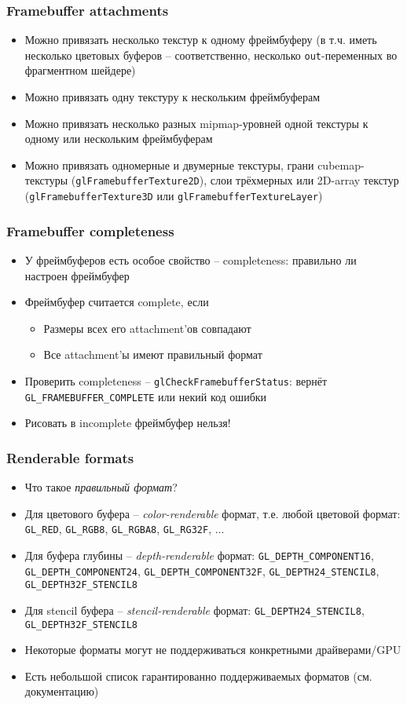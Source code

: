 \documentclass{beamer}
\begin{document}
\begin{frame}[fragile]
\frametitle{Framebuffer attachments}
\begin{itemize}
\item Можно привязать несколько текстур к одному фреймбуферу (в т.ч. иметь несколько цветовых буферов -- соответственно, несколько \verb|out|-переменных во фрагментном шейдере)
\pause
\item Можно привязать одну текстуру к нескольким фреймбуферам
\pause
\item Можно привязать несколько разных mipmap-уровней одной текстуры к одному или нескольким фреймбуферам
\pause
\item Можно привязать одномерные и двумерные текстуры, грани cubemap-текстуры (\verb|glFramebufferTexture2D|), слои трёхмерных или 2D-array текстур (\verb|glFramebufferTexture3D| или \verb|glFramebufferTextureLayer|)
\end{itemize}
\end{frame}

\begin{frame}[fragile]
\frametitle{Framebuffer completeness}
\begin{itemize}
\item У фреймбуферов есть особое свойство -- completeness: правильно ли настроен фреймбуфер
\pause
\item Фреймбуфер считается complete, если
\begin{itemize}
\item Размеры всех его attachment'ов совпадают
\pause
\item Все attachment'ы имеют правильный формат
\end{itemize}
\pause
\item Проверить completeness -- \verb|glCheckFramebufferStatus|: вернёт \verb|GL_FRAMEBUFFER_COMPLETE| или некий код ошибки
\pause
\item Рисовать в incomplete фреймбуфер нельзя!
\end{itemize}
\end{frame}

\begin{frame}[fragile]
\frametitle{Renderable formats}
\begin{itemize}
\item Что такое \textit{правильный формат}?
\pause
\item Для цветового буфера -- \textit{color-renderable} формат, т.е. любой цветовой формат: \verb|GL_RED|, \verb|GL_RGB8|, \verb|GL_RGBA8|, \verb|GL_RG32F|, ...
\pause
\item Для буфера глубины -- \textit{depth-renderable} формат: \verb|GL_DEPTH_COMPONENT16|, \verb|GL_DEPTH_COMPONENT24|, \verb|GL_DEPTH_COMPONENT32F|, \verb|GL_DEPTH24_STENCIL8|, \verb|GL_DEPTH32F_STENCIL8|
\pause
\item Для stencil буфера -- \textit{stencil-renderable} формат: \verb|GL_DEPTH24_STENCIL8|, \verb|GL_DEPTH32F_STENCIL8|
\pause
\item Некоторые форматы могут не поддерживаться конкретными драйверами/GPU
\pause
\item Есть небольшой список гарантированно поддерживаемых форматов (см. документацию)
\end{itemize}
\end{frame}
\end{document}

